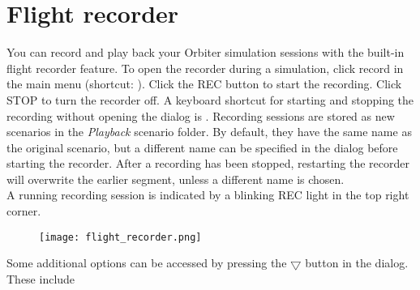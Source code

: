 \documentclass[Orbiter User Manual.tex]{subfiles}
\begin{document}
\section{Flight recorder}
You can record and play back your Orbiter simulation sessions with the built-in flight recorder feature. To open the recorder during a simulation, click record in the main menu (shortcut: \Ctrl{}). Click the REC button to start the recording. Click STOP to turn the recorder off. A keyboard shortcut for starting and stopping the recording without opening the dialog is \Ctrl{}. Recording sessions are stored as new scenarios in the \textit{Playback} scenario folder. By default, they have the same name as the original scenario, but a different name can be specified in the dialog before starting the recorder. After a recording has been stopped, restarting the recorder will overwrite the earlier segment, unless a different name is chosen.\\
A running recording session is indicated by a blinking REC light in the top right corner.\\

\begin{figure}[H]
	\centering
	\texttt{[image: flight\_recorder.png]}
\end{figure}

\noindent
Some additional options can be accessed by pressing the $\bigtriangledown$ button in the dialog. These include
\end{document}
